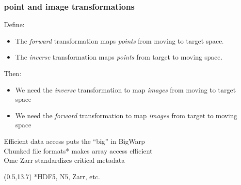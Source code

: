 \documentclass[aspectratio=169]{beamer}
\newcommand\rightfoot[1]{
    \begin{textblock}{15}(0.5,13.7)
        {\color{gray} \scriptsize \hspace*{0pt}{\hfill} #1}
    \end{textblock}
}
\begin{document}
\begin{frame}[plain]
\end{frame}

\begin{frame}[plain]%
\frametitle{point and image transformations}
    
    Define:
    \begin{itemize}
        \item The \emph{forward} transformation maps \emph{points}
            \newline from moving to target space.
        \item The \emph{inverse} transformation maps \emph{points}
            \newline from target to moving space.
    \end{itemize}

    Then:
    \begin{itemize}
        \item We need the \emph{inverse} transformation to map
            \emph{images} \newline from moving to target space
        \item We need the \emph{forward} transformation to map
            \emph{images} \newline from target to moving space
    \end{itemize}

\end{frame}


\begin{frame}{}

\begin{center}
    Efficient data access puts the ``big'' in BigWarp \\
    \vspace{1em}Chunked file formats* makes array access efficient \\
    \vspace{1em}Ome-Zarr standardizes critical metadata
\end{center}

\rightfoot{ \scriptsize{ *HDF5, N5, Zarr, etc.}}
\end{frame}
\end{document}
